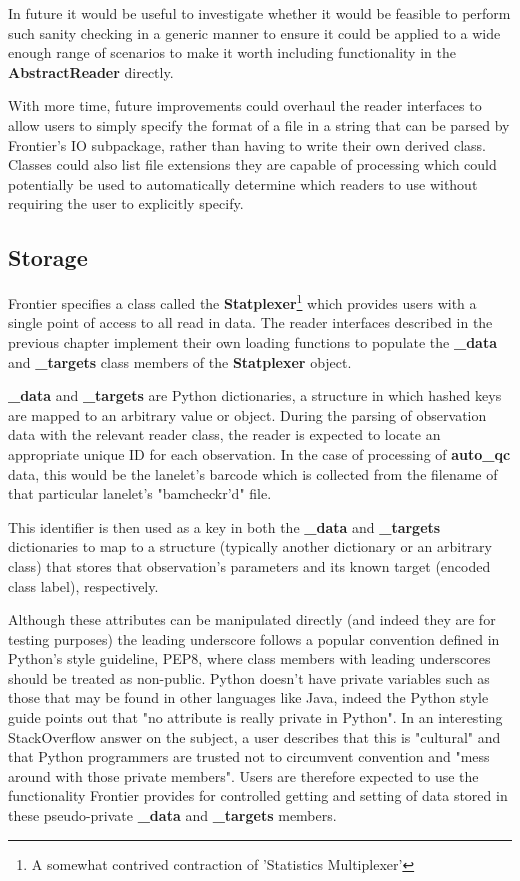 In future it would be useful to investigate whether it would be feasible to
perform such sanity checking in a generic manner to ensure it could be applied
to a wide enough range of scenarios to make it worth including functionality in
the \textbf{AbstractReader} directly.

With more time, future improvements could overhaul the reader interfaces
to allow users to simply specify the format of a file in a string that can be
parsed by Frontier's IO subpackage, rather than having to write their own derived
class. Classes could also list file extensions they are capable of processing
which could potentially be used to automatically determine which readers to use
without requiring the user to explicitly specify.


\subsection{Storage}

Frontier specifies a class called the \textbf{Statplexer}\footnote{A somewhat
contrived contraction of 'Statistics Multiplexer'} which provides users with a
single point of access to all read in data. The reader interfaces described in
the previous chapter implement their own loading functions to populate the
\textbf{\_data} and \textbf{\_targets} class members of the \textbf{Statplexer}
object.


\textbf{\_data} and \textbf{\_targets} are Python dictionaries, a structure in
which hashed keys are mapped to an arbitrary value or object. During the parsing
of observation data with the relevant reader class, the reader is expected to
locate an appropriate unique ID for each observation. In the case of processing
of \textbf{auto\_qc} data, this would be the lanelet's barcode which is
collected from the filename of that particular lanelet's "bamcheckr'd" file.

This identifier is then used as a key in both the \textbf{\_data} and
\textbf{\_targets} dictionaries to map to a structure (typically another
dictionary or an arbitrary class) that stores that observation's parameters
and its known target (encoded class label), respectively.

Although these attributes can be manipulated directly (and indeed they are for
testing purposes) the leading underscore follows a popular convention defined in
Python's style guideline, PEP8\citep{pep8}, where class members with leading
underscores should be treated as non-public. Python doesn't have private
variables such as those that may be found in other languages like Java, indeed
the Python style guide points out that "no attribute is really private in
Python"\citep{pep8}. In an interesting StackOverflow answer on the subject, a
user describes that this is "cultural"\citep{so:pythonprivate} and that Python
programmers are trusted not to circumvent convention and "mess around with those
private members". Users are therefore expected to use the functionality
Frontier provides for controlled getting and setting of data stored in these
pseudo-private \textbf{\_data} and \textbf{\_targets} members.

